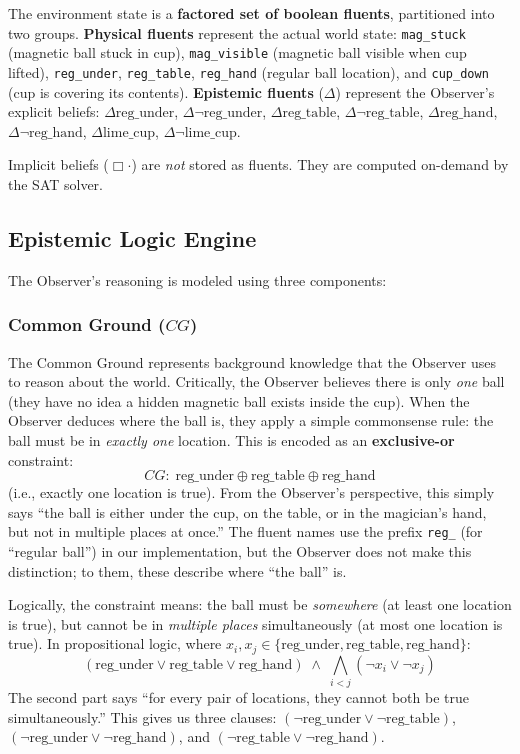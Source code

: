 \documentclass[letterpaper, 10 pt, conference]{ieeeconf}  %
\newcommand{\EBel}[1]{\ensuremath{\Delta #1}} %
\newcommand{\IBel}[1]{\ensuremath{\Box #1}}   %
\newcommand{\CG}{\ensuremath{\mathit{CG}}}    %
\begin{document}
The environment state is a \textbf{factored set of boolean fluents}, partitioned into two groups.
\textbf{Physical fluents} represent the actual world state: \texttt{mag\_stuck} (magnetic ball stuck in cup), \texttt{mag\_visible} (magnetic ball visible when cup lifted), \texttt{reg\_under}, \texttt{reg\_table}, \texttt{reg\_hand} (regular ball location), and \texttt{cup\_down} (cup is covering its contents).
\textbf{Epistemic fluents} ($\Delta$) represent the Observer's explicit beliefs: $\EBel{\text{reg\_under}}$, $\EBel{\neg\text{reg\_under}}$, $\EBel{\text{reg\_table}}$, $\EBel{\neg\text{reg\_table}}$, $\EBel{\text{reg\_hand}}$, $\EBel{\neg\text{reg\_hand}}$, $\EBel{\text{lime\_cup}}$, $\EBel{\neg\text{lime\_cup}}$.

Implicit beliefs ($\IBel{\cdot}$) are \emph{not} stored as fluents. They are computed on-demand by the SAT solver.

\subsection{Epistemic Logic Engine}

The Observer's reasoning is modeled using three components:

\subsubsection{Common Ground (\texorpdfstring{$\CG$}{CG})}
The Common Ground represents background knowledge that the Observer uses to reason about the world. Critically, the Observer believes there is only \emph{one} ball (they have no idea a hidden magnetic ball exists inside the cup). When the Observer deduces where the ball is, they apply a simple commonsense rule: the ball must be in \emph{exactly one} location. This is encoded as an \textbf{exclusive-or} constraint:
\[
    \CG:\; \text{reg\_under} \oplus \text{reg\_table} \oplus \text{reg\_hand}
\]
\vspace{-1ex}\noindent(i.e., exactly one location is true).
From the Observer's perspective, this simply says ``the ball is either under the cup, on the table, or in the magician's hand, but not in multiple places at once.'' The fluent names use the prefix \texttt{reg\_} (for ``regular ball'') in our implementation, but the Observer does not make this distinction; to them, these describe where ``the ball'' is.

Logically, the constraint means: the ball must be \emph{somewhere} (at least one location is true), but cannot be in \emph{multiple places} simultaneously (at most one location is true). In propositional logic, where $x_i, x_j \in \{\text{reg\_under}, \text{reg\_table}, \text{reg\_hand}\}$:
\[
    (\text{reg\_under} \lor \text{reg\_table} \lor \text{reg\_hand}) 
    \;\land\; 
    \bigwedge_{i < j} (\neg x_i \lor \neg x_j)
\]
The second part says ``for every pair of locations, they cannot both be true simultaneously.'' This gives us three clauses: $(\neg\text{reg\_under} \lor \neg\text{reg\_table})$, $(\neg\text{reg\_under} \lor \neg\text{reg\_hand})$, and $(\neg\text{reg\_table} \lor \neg\text{reg\_hand})$.
\end{document}
